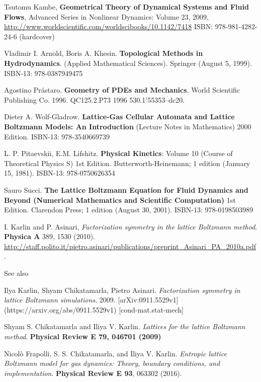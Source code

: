 \documentclass[twoside,landscape,10pt]{amsart}
\theoremstyle{plain}
\theoremstyle{definition}
\theoremstyle{remark}
\theoremstyle{remark}
\begin{document}
\begin{thebibliography}{9}
Tsutomu Kambe, \textbf{Geometrical Theory of Dynamical Systems and Fluid Flows}, Advanced Series in Nonlinear Dynamics: Volume 23, 2009, \url{http://www.worldscientific.com/worldscibooks/10.1142/7418} ISBN: 978-981-4282-24-6 (hardcover)

Vladimir I. Arnold, Boris A. Khesin.  \textbf{Topological Methods in Hydrodynamics}. (Applied Mathematical Sciences).  Springer (August 5, 1999).  ISBN-13: 978-0387949475

Agostino Pr\'{a}staro.  \textbf{Geometry of PDEs and Mechanics}.  World Scientific Publishing Co.  1996.  QC125.2.P73 1996  530.1'55353--dc20.  

Dieter A. Wolf-Gladrow.  \textbf{Lattice-Gas Cellular Automata and Lattice Boltzmann Models: An Introduction} (Lecture Notes in Mathematics) 2000 Edition.  ISBN-13: 978-3540669739


L. P. Pitaevskii, E.M. Lifshitz. \textbf{Physical Kinetics}: Volume 10 (Course of Theoretical Physics S) 1st Edition.  Butterworth-Heinemann; 1 edition (January 15, 1981).  ISBN-13: 978-0750626354

 Sauro Succi.  \textbf{The Lattice Boltzmann Equation for Fluid Dynamics and Beyond (Numerical Mathematics and Scientific Computation)} 1st Edition.  Clarendon Press; 1 edition (August 30, 2001).  ISBN-13: 978-0198503989



I. Karlin and P. Asinari, \emph{Factorization symmetry in the lattice Boltzmann method}.  \textbf{Physica A} 389, 1530 (2010).  \url{http://staff.polito.it/pietro.asinari/publications/preprint_Asinari_PA_2010a.pdf}.  

See also

Ilya Karlin, Shyam Chikatamarla, Pietro Asinari. \emph{Factorization symmetry in lattice Boltzmann simulations}.  2009.  [arXiv:0911.5529v1](https://arxiv.org/abs/0911.5529v1) [cond-mat.stat-mech] 

Shyam S. Chikatamarla and Iliya V. Karlin.  \emph{Lattices for the lattice Boltzmann method}.  \textbf{Physical Review E 79, 046701 (2009)}  
  
  Nicol\`{o} Frapolli, S. S. Chikatamarla, and Iliya V. Karlin.  \emph{Entropic lattice Boltzmann model for gas dynamics: Theory, boundary conditions, and implementation}.  \textbf{Physical Review E 93}, 063302 (2016).


\end{thebibliography}
\end{document}
